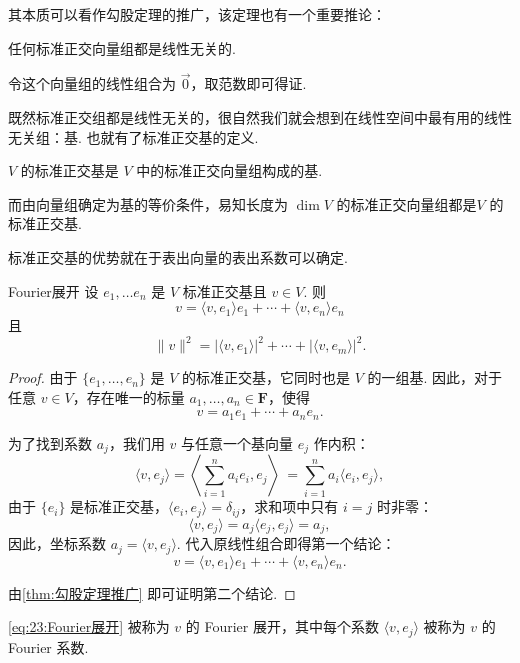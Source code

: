 其本质可以看作勾股定理的推广，该定理也有一个重要推论：

\begin{theorem}{}{}
    任何标准正交向量组都是线性无关的.
\end{theorem}

令这个向量组的线性组合为 $ \vec{0} $，取范数即可得证.

既然标准正交组都是线性无关的，很自然我们就会想到在线性空间中最有用的线性无关组：基. 也就有了标准正交基的定义.

\begin{definition}{}{}
    $ V $ 的标准正交基是 $ V $ 中的标准正交向量组构成的基.
\end{definition}

而由向量组确定为基的等价条件，易知长度为 $\dim V$ 的标准正交向量组都是$ V $ 的标准正交基.

标准正交基的优势就在于表出向量的表出系数可以确定.

\begin{theorem}{}{Fourier展开}
    设 $e_1, \ldots e_n$ 是 $ V $ 标准正交基且 $ v \in V$. 则
    \begin{equation} \label{eq:23:Fourier展开}
        v = \langle v, e_1 \rangle e_1 + \cdots + \langle v, e_n \rangle e_n
    \end{equation}
    且
    \[ \lVert v \rVert^2 = \lvert \langle v, e_1\rangle \rvert^2 + \cdots + \lvert \langle v, e_m\rangle \rvert^2. \]
\end{theorem}

\begin{proof}
    由于 $\{e_1, \ldots, e_n\}$ 是 $V$ 的标准正交基，它同时也是 $V$ 的一组基. 因此，对于任意 $v \in V$，存在唯一的标量 $a_1, \ldots, a_n \in \mathbf{F}$，使得
    \[ v = a_1 e_1 + \cdots + a_n e_n. \]

    为了找到系数 $a_j$，我们用 $v$ 与任意一个基向量 $e_j$ 作内积：
    \[ \langle v, e_j \rangle = \left\langle \sum_{i=1}^{n} a_i e_i, e_j \right\rangle \ = \sum_{i=1}^{n} a_i \langle e_i, e_j \rangle, \]
    由于 $\{e_i\}$ 是标准正交基，$\langle e_i, e_j \rangle = \delta_{ij}$，求和项中只有 $i=j$ 时非零：
    \[ \langle v, e_j \rangle = a_j \langle e_j, e_j \rangle  = a_j, \]
    因此，坐标系数 $a_j = \langle v, e_j \rangle$. 代入原线性组合即得第一个结论：
    \[ v = \langle v, e_1 \rangle e_1 + \cdots + \langle v, e_n \rangle e_n. \]

    由\autoref{thm:勾股定理推广} 即可证明第二个结论.
\end{proof}

\autoref{eq:23:Fourier展开} 被称为 $ v $ 的 Fourier 展开，其中每个系数 $ \langle v, e_j \rangle $ 被称为 $ v $ 的 Fourier 系数.

